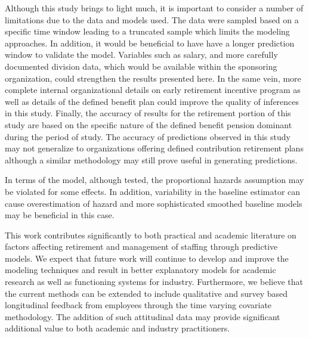 \documentclass[12pt,letterpaper]{article}
\begin{document}
Although this study brings to light much, it is important to consider a number of limitations due to the data and models used.  The data were sampled based on a specific time window leading to a truncated sample which limits the modeling approaches.  In addition,  it would be beneficial to have have a longer prediction window to validate the model.  Variables such as salary, and more carefully documented division data, which would be available within the sponsoring organization, could strengthen the results presented here.  In the same vein, more complete internal organizational details on early retirement incentive program as well as details of the defined benefit plan could improve the quality of inferences in this study.  Finally, the accuracy of results for the retirement portion of this study are based on the specific nature of the defined benefit pension dominant during the period of study.  The accuracy of predictions observed in this study may not generalize to organizations offering defined contribution retirement plans although a similar methodology may still prove useful in generating predictions.


In terms of the model, although tested, the proportional hazards assumption may be violated for some effects.  In addition, variability in the baseline estimator can cause overestimation of hazard and more sophisticated smoothed baseline models may be beneficial in this case.

This work contributes significantly to both practical and academic literature on factors affecting retirement and management of staffing through predictive models. We expect that future work will continue to develop and improve the modeling techniques and result in better explanatory models for academic research as well as functioning systems for industry.  Furthermore, we believe that the current methods can be extended to include qualitative and survey based longitudinal feedback from employees through the time varying covariate methodology.  The addition of such attitudinal data may provide significant additional value to both academic and industry practitioners.


	
\end{document}
